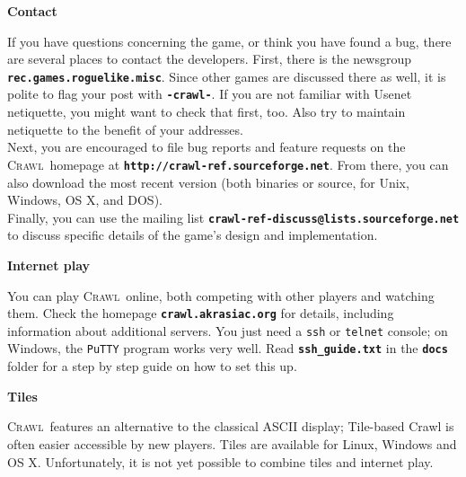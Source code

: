 \documentclass[a4paper,10pt]{article}
\newcommand{\key}[1]{{{\texttt{\textbf{#1}}}}} %
\newcommand{\sex}[1]{{{\textbf{#1}}}} %
\newcommand{\crawl}{\textsc{Crawl}}
\newcommand{\para}{\vspace{1.5ex}}
\begin{document}
\para\para

\sex{Contact}

\para
	    
If you have questions concerning the game, or think you have found a bug, 
there are several places to contact the developers. First, there is the 
newsgroup \key{rec.games.roguelike.misc}. Since other games are 
discussed there as well, it is polite to flag your post with \key{-crawl-}.
If you are not familiar with Usenet netiquette, you might want to check 
that first, too.
Also try to maintain netiquette to the benefit of your addresses.
\\
Next, you are encouraged to file bug reports and feature requests on the 
\crawl\ homepage at \key{http://crawl-ref.sourceforge.net}. From there, you 
can also download the most recent version (both binaries or source, for 
Unix, Windows, OS X, and DOS).
\\
Finally, you can use the mailing list 
\key{crawl-ref-discuss@lists.sourceforge.net}
to discuss specific details of the game's design and implementation.

\para \para

\sex{Internet play}

\para

You can play \crawl\ online, both competing with other players and watching 
them. Check the homepage \key{crawl.akrasiac.org} for details, including 
information about additional servers. You just need a \texttt{ssh} or 
\texttt{telnet} console; on Windows, the \texttt{PuTTY} program works very 
well. Read \key{ssh\_guide.txt} in the \key{docs} folder for a step by step 
guide on how to set this up.

\para \para

\sex{Tiles}

\para

\crawl\ features an alternative to the classical ASCII display; Tile-based
Crawl is often easier accessible by new players. Tiles are available for 
Linux, Windows and OS X.
Unfortunately, it is not yet possible to combine tiles and internet play.
\end{document}
